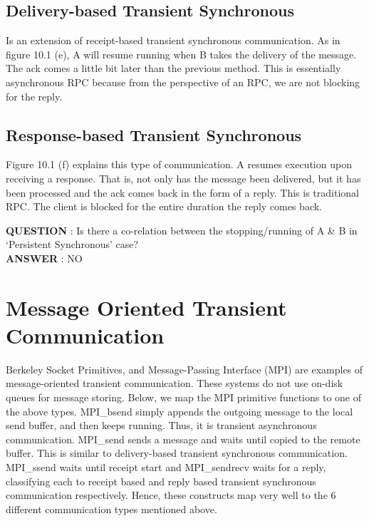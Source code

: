 \documentclass[twoside]{article}
\begin{document}

\subsection{Delivery-based Transient Synchronous}
Is an extension of receipt-based transient synchronous communication. As in figure 10.1 (e), A will resume running when B takes the delivery of the message. The ack comes a little bit later than the previous method. This is essentially asynchronous RPC because from the perspective of an RPC, we are not blocking for the reply.

\subsection{Response-based Transient Synchronous}
Figure 10.1 (f) explains this type of communication. A resumes execution upon receiving a response. That is, not only has the message been delivered, but it has been processed and the ack comes back in the form of a reply. This is traditional RPC. The client is blocked for the entire duration the reply comes back.

\textbf{QUESTION} : Is there a co-relation between the stopping/running of A \& B in `Persistent Synchronous' case?\\
\textbf{ANSWER} : NO 

\section{Message Oriented Transient Communication}
Berkeley Socket Primitives, and Message-Passing Interface (MPI) are examples of message-oriented transient communication. These systems do not use on-disk queues for message storing. Below, we map the MPI primitive functions to one of the above types. MPI\_bsend simply appends the outgoing message to the local send buffer, and then keeps running. Thus, it is transient asynchronous communication. MPI\_send sends a message and waits until copied to the remote buffer. This is similar to delivery-based transient synchronous communication. MPI\_ssend waits until receipt start and MPI\_sendrecv waits for a reply, classifying each to receipt based and reply based transient synchronous communication respectively. Hence, these constructs map very well to the 6 different communication types mentioned above.
\end{document}
